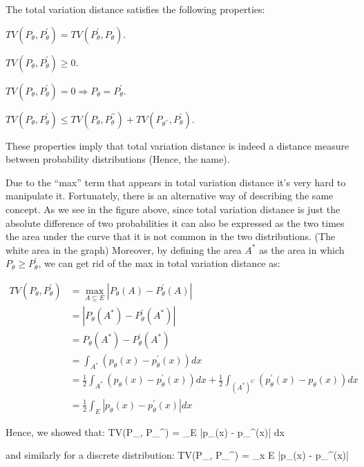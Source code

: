 The total variation distance satisfies the following properties:
\bit
\item $TV(P_{\theta}, P_{\theta}^{\prime}) = TV(P_{\theta}^{\prime}, P_{\theta})$.
\item $TV(P_{\theta}, P_{\theta}^{\prime}) \geq 0$.
\item $TV(P_{\theta}, P_{\theta}^{\prime}) =0 \Rightarrow P_{\theta} = P_{\theta}^{\prime}$.
\item $TV(P_{\theta}, P_{\theta}^{\prime}) \leq TV(P_{\theta}, P_{\theta}^{\prime\prime}) +
TV(P_{\theta^{\prime\prime}}, P_{\theta}^{\prime})$.
\eit

These properties imply that total variation distance is indeed a distance measure between probability distributions
(Hence, the name).


Due to the ``max'' term that appears in total variation distance it's very hard to manipulate it. Fortunately,
there is an alternative way of describing the same concept. As we see in the figure above, since total variation
distance is just the absolute difference of two probabilities it can also be expressed as the two times the area
under the curve that it is not common in the two distributions. (The white area in the graph) Moreover, by defining
the area $A^*$ as the area in which $P_{\theta} \geq P_{\theta}^{\prime}$, we can get rid of the max in total
variation distance as:

{\setlength{\jot}{10pt}
\begin{align*}
TV(P_{\theta}, P_{\theta}^{\prime}) & = \max_{A \subseteq E} |P_{\theta} (A) - P_{\theta}^{\prime}(A)| \\
&= |P_{\theta}(A^*) - P_{\theta}^{\prime}(A^*)| \\
&= P_{\theta}(A^*) - P_{\theta}^{\prime}(A^*) \\
&= \int_{A^*} (p_{\theta}(x) - p_{\theta}^{\prime}(x)) dx \\
&= \frac{1}{2} \int_{A^*} (p_{\theta}(x) - p_{\theta}^{\prime}(x)) dx + \frac{1}{2} \int_{(A^*)^C}
(p_{\theta}^{\prime}(x) - p_{\theta}(x)) dx \\
&= \frac{1}{2} \int_{E} |p_{\theta}(x) - p_{\theta}^{\prime}(x)| dx
\end{align*}}

Hence, we showed that:
\bse
TV(P_{\theta}, P_{\theta}^{\prime}) =  \int_{E} |p_{\theta}(x) - p_{\theta}^{\prime}(x)| dx
\ese

and similarly for a discrete distribution:
\bse
TV(P_{\theta}, P_{\theta}^{\prime}) =  \sum_{x \in E} |p_{\theta}(x) - p_{\theta}^{\prime}(x)|
\ese

